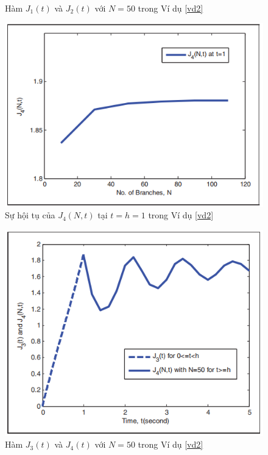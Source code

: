 \begin{vd}
\begin{figure}[h!]
	\caption[Hàm $J_1(t)$ và $J_2(t)$ với $N = 50$ trong Ví dụ \ref{vd2} ]{Hàm $J_1(t)$ và $J_2(t)$ với $N = 50$ trong Ví dụ \ref{vd2}}
	\label{fig:hinh-17}
\end{figure}
\begin{figure}[h!]
	\centering
	\includegraphics[scale= 0.7]{"./Hinh/Hinh18"}
	\caption[Sự hội tụ của $J_4(N,t)$ tại $t = h = 1$ trong Ví dụ \ref{vd2} ]{Sự hội tụ của $J_4(N,t)$ tại $t = h = 1$ trong Ví dụ \ref{vd2}}
	\label{fig:hinh-18}
\end{figure}
\begin{figure}[h!]
	\centering
	\includegraphics[scale= 0.7]{"./Hinh/Hinh19"}
	\caption[Hàm $J_3(t)$ và $J_4(t)$ với $N = 50$ trong Ví dụ \ref{vd2} ]{Hàm $J_3(t)$ và $J_4(t)$ với $N = 50$ trong Ví dụ \ref{vd2}}

\end{figure}
\end{vd}
